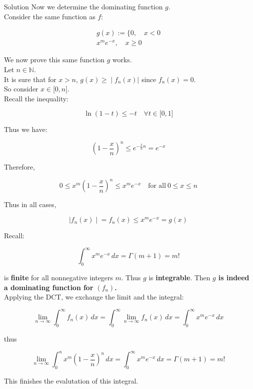 \documentclass{qlnotes-export}
\begin{document}
\begin{qlsolution}{Solution}
Now we determine the dominating function \(g\).\\
Consider the same function as \(f\):

\[\begin{matrix}
{g(x) := \{ 0,\quad x < 0} \\
{x^{m}e^{- x},\quad x \geq 0}
\end{matrix}\]

We now prove this same function \(g\) works.\\
Let \(n \in {\mathbb{N}}\).\\
It is sure that for \(x > n\), \(\left. g(x) \geq \middle| f_{n}(x)| \right.\) since \(f_{n}(x) = 0\).\\
So consider \(x \in \lbrack 0,n\rbrack\).\\
Recall the inequality:

\[\ln(1 - t) \leq - t\quad\forall t \in \lbrack 0,1\rbrack\]

Thus we have:

\[\left( {1 - \frac{x}{n}} \right)^{n} \leq e^{- \frac{x}{n}n} = e^{- x}\]

Therefore,

\[0 \leq x^{m}\left( {1 - \frac{x}{n}} \right)^{n} \leq x^{m}e^{- x}\quad\text{for all}\ 0 \leq x \leq n\]

Thus in all cases,

\[\left. |f_{n}(x) \middle| = f_{n}(x) \leq x^{m}e^{- x} = g(x) \right.\]

Recall:

\[\int_{0}^{\infty}x^{m}e^{- x}\, dx = \Gamma(m + 1) = m!\]

is \textbf{finite} for all nonnegative integers \(m\). Thus \(g\) is \textbf{integrable}. Then \textbf{\(g\) is indeed a dominating function for \((f_{n})\).}\\
Applying the DCT, we exchange the limit and the integral:

\[\lim\limits_{n\rightarrow\infty}\int_{0}^{\infty}f_{n}(x)\, dx = \int_{0}^{\infty}\lim\limits_{n\rightarrow\infty}f_{n}(x)\, dx = \int_{0}^{\infty}x^{m}e^{- x}\, dx\]

thus

\[\lim\limits_{n\rightarrow\infty}\int_{0}^{n}x^{m}\left( {1 - \frac{x}{n}} \right)^{n}\, dx = \int_{0}^{\infty}x^{m}e^{- x}\, dx = \Gamma(m + 1) = m!\]

This finishes the evalutation of this integral.

\end{qlsolution}
\end{document}

